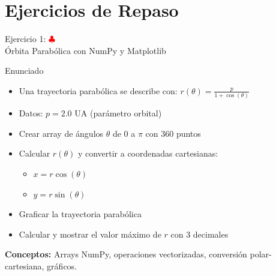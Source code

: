 \documentclass[10pt]{beamer}
\begin{document}
\section{Ejercicios de Repaso}

\begin{frame}{Ejercicio 1: \hfill \textcolor{red}{$\clubsuit$} \\ Órbita Parabólica con NumPy y Matplotlib}
  \begin{block}{Enunciado}
    \begin{itemize}
      \item Una trayectoria parabólica se describe con: \(r(\theta) = \frac{p}{1 + \cos(\theta)}\)
      \item Datos: \(p = 2.0\) UA (parámetro orbital)
      \item Crear array de ángulos \(\theta\) de 0 a \(\pi\) con 360 puntos
      \item Calcular \(r(\theta)\) y convertir a coordenadas cartesianas:
        \begin{itemize}
          \item \(x = r \cos(\theta)\)
          \item \(y = r \sin(\theta)\)
        \end{itemize}
      \item Graficar la trayectoria parabólica
      \item Calcular y mostrar el valor máximo de \(r\) con 3 decimales
    \end{itemize}
  \end{block}
  \textbf{Conceptos:} Arrays NumPy, operaciones vectorizadas, conversión polar-cartesiana, gráficos.
\end{frame}
\end{document}
